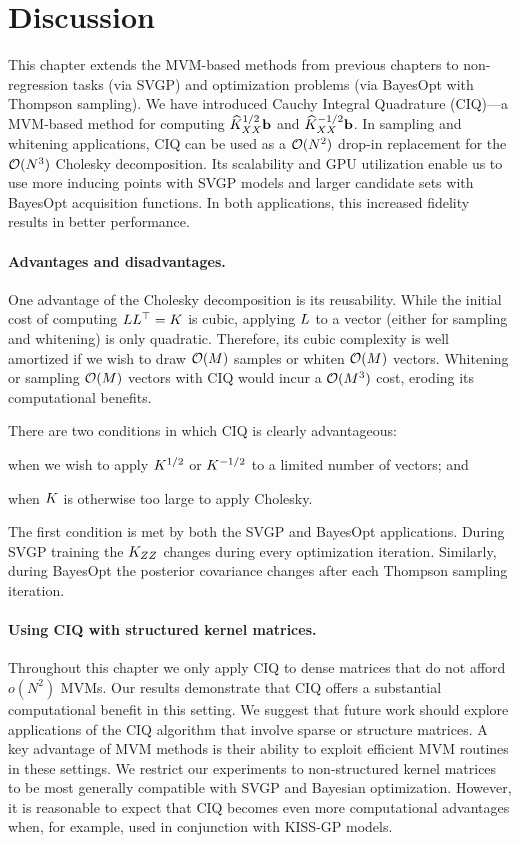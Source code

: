 \section{Discussion}

This chapter extends the MVM-based methods from previous chapters to non-regression tasks (via SVGP) and optimization problems (via BayesOpt with Thompson sampling).
We have introduced Cauchy Integral Quadrature (CIQ)---a MVM-based method for computing $\widehat{K}_{XX}^{1/2} \mathbf{b}$ and $\widehat{K}_{XX}^{-1/2} \mathbf{b}$.
In sampling and whitening applications, CIQ can be used as a $\bigo{N^2}$ drop-in replacement for the $\bigo{N^3}$ Cholesky decomposition.
Its scalability and GPU utilization enable us to use more inducing points with SVGP models and larger candidate sets with BayesOpt acquisition functions.
In both applications, this increased fidelity results in better performance.


\paragraph{Advantages and disadvantages.}
One advantage of the Cholesky decomposition is its reusability.
While the initial cost of computing $L L^\top = K$ is cubic, applying $L$ to a vector (either for sampling and whitening) is only quadratic.
Therefore, its cubic complexity is well amortized if we wish to draw $\bigo{M}$ samples or whiten $\bigo{M}$ vectors.
Whitening or sampling $\bigo{M}$ vectors with CIQ would incur a $\bigo{M^3}$ cost, eroding its computational benefits.

There are two conditions in which CIQ is clearly advantageous:
%
\begin{enumerate*}
  \item when we wish to apply $K^{1/2}$ or $K^{-1/2}$ to a limited number of vectors; and
  \item when $K$ is otherwise too large to apply Cholesky.
\end{enumerate*}
%
The first condition is met by both the SVGP and BayesOpt applications.
During SVGP training the $K_{ZZ}$ changes during every optimization iteration.
Similarly, during BayesOpt the posterior covariance changes after each Thompson sampling iteration.


\paragraph{Using CIQ with structured kernel matrices.}
Throughout this chapter we only apply CIQ to dense matrices that do not afford $o(N^2)$ MVMs.
Our results demonstrate that CIQ offers a substantial computational benefit in this setting.
We suggest that future work should explore applications of the CIQ algorithm that involve sparse or structure matrices.
A key advantage of MVM methods is their ability to exploit efficient MVM routines in these settings.
We restrict our experiments to non-structured kernel matrices to be most generally compatible with SVGP and Bayesian optimization.
However, it is reasonable to expect that CIQ becomes even more computational advantages when, for example, used in conjunction with KISS-GP models.


